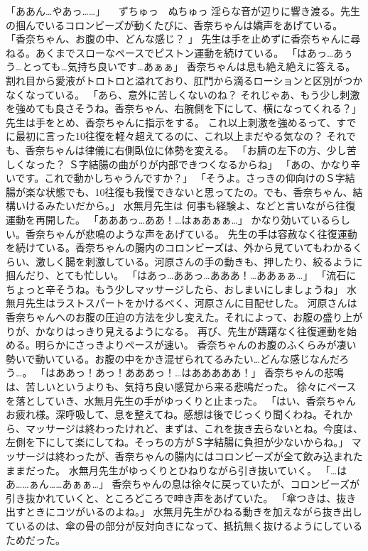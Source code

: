 「ああん…やあっ……」
　ずちゅっ　ぬちゅっ
淫らな音が辺りに響き渡る。先生の掴んでいるコロンビーズが動くたびに、香奈ちゃんは嬌声をあげている。
「香奈ちゃん、お腹の中、どんな感じ？ 」
先生は手を止めずに香奈ちゃんに尋ねる。あくまでスローなペースでピストン運動を続けている。
「はあっ…あぅう…とっても…気持ち良いです…あぁぁ」
香奈ちゃんは息も絶え絶えに答える。割れ目から愛液がトロトロと溢れており、肛門から滴るローションと区別がつかなくなっている。
「あら、意外に苦しくないのね？ それじゃあ、もう少し刺激を強めても良さそうね。香奈ちゃん、右腕側を下にして、横になってくれる？」
先生は手をとめ、香奈ちゃんに指示をする。
これ以上刺激を強めるって、すでに最初に言った10往復を軽々超えてるのに、これ以上まだやる気なの？
それでも、香奈ちゃんは律儀に右側臥位に体勢を変える。
「お臍の左下の方、少し苦しくなった？ Ｓ字結腸の曲がりが内部できつくなるからね」
「あの、かなり辛いです。これで動かしちゃうんですか？」
「そうよ。さっきの仰向けのＳ字結腸が楽な状態でも、10往復も我慢できないと思ってたの。でも、香奈ちゃん、結構いけるみたいだから。」
水無月先生は 何事も経験よ、などと言いながら往復運動を再開した。
「あああっ…ああ！…はぁあぁぁ…」
かなり効いているらしい。香奈ちゃんが悲鳴のような声をあげている。
先生の手は容赦なく往復運動を続けている。香奈ちゃんの腸内のコロンビーズは、外から見ていてもわかるくらい、激しく腸を刺激している。河原さんの手の動きも、押したり、絞るように掴んだり、とても忙しい。
「はあっ…ああっ…あああ！…ああぁぁ…」
「流石にちょっと辛そうね。もう少しマッサージしたら、おしまいにしましょうね」
水無月先生はラストスパートをかけるべく、河原さんに目配せした。
河原さんは香奈ちゃんへのお腹の圧迫の方法を少し変えた。それによって、お腹の盛り上がりが、かなりはっきり見えるようになる。
再び、先生が躊躇なく往復運動を始める。明らかにさっきよりペースが速い。
香奈ちゃんのお腹のふくらみが凄い勢いで動いている。お腹の中をかき混ぜられてるみたい…どんな感じなんだろう…。
「はああっ！あっ！あああっ！…はあああああ！」
香奈ちゃんの悲鳴は、苦しいというよりも、気持ち良い感覚から来る悲鳴だった。
徐々にペースを落としていき、水無月先生の手がゆっくりと止まった。
「はい、香奈ちゃんお疲れ様。深呼吸して、息を整えてね。感想は後でじっくり聞くわね。それから、マッサージは終わったけれど、まずは、これを抜き去らないとね。今度は、左側を下にして楽にしてね。そっちの方がＳ字結腸に負担が少ないからね。」
マッサージは終わったが、香奈ちゃんの腸内にはコロンビーズが全て飲み込まれたままだった。
水無月先生がゆっくりとひねりながら引き抜いていく。
「…はあ……ぁん……あぁぁ…」
香奈ちゃんの息は徐々に戻っていたが、コロンビーズが引き抜かれていくと、ところどころで呻き声をあげていた。
「傘つきは、抜き出すときにコツがいるのよね。」
水無月先生がひねる動きを加えながら抜き出しているのは、傘の骨の部分が反対向きになって、抵抗無く抜けるようにしているためだった。
